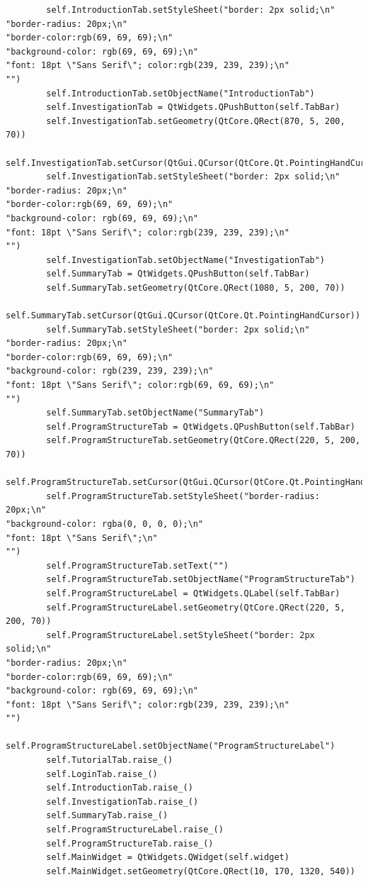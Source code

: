 \documentclass{article}
\begin{document}
\begin{lstlisting}
        self.IntroductionTab.setStyleSheet("border: 2px solid;\n"
"border-radius: 20px;\n"
"border-color:rgb(69, 69, 69);\n"
"background-color: rgb(69, 69, 69);\n"
"font: 18pt \"Sans Serif\"; color:rgb(239, 239, 239);\n"
"")
        self.IntroductionTab.setObjectName("IntroductionTab")
        self.InvestigationTab = QtWidgets.QPushButton(self.TabBar)
        self.InvestigationTab.setGeometry(QtCore.QRect(870, 5, 200, 70))
        self.InvestigationTab.setCursor(QtGui.QCursor(QtCore.Qt.PointingHandCursor))
        self.InvestigationTab.setStyleSheet("border: 2px solid;\n"
"border-radius: 20px;\n"
"border-color:rgb(69, 69, 69);\n"
"background-color: rgb(69, 69, 69);\n"
"font: 18pt \"Sans Serif\"; color:rgb(239, 239, 239);\n"
"")
        self.InvestigationTab.setObjectName("InvestigationTab")
        self.SummaryTab = QtWidgets.QPushButton(self.TabBar)
        self.SummaryTab.setGeometry(QtCore.QRect(1080, 5, 200, 70))
        self.SummaryTab.setCursor(QtGui.QCursor(QtCore.Qt.PointingHandCursor))
        self.SummaryTab.setStyleSheet("border: 2px solid;\n"
"border-radius: 20px;\n"
"border-color:rgb(69, 69, 69);\n"
"background-color: rgb(239, 239, 239);\n"
"font: 18pt \"Sans Serif\"; color:rgb(69, 69, 69);\n"
"")
        self.SummaryTab.setObjectName("SummaryTab")
        self.ProgramStructureTab = QtWidgets.QPushButton(self.TabBar)
        self.ProgramStructureTab.setGeometry(QtCore.QRect(220, 5, 200, 70))
        self.ProgramStructureTab.setCursor(QtGui.QCursor(QtCore.Qt.PointingHandCursor))
        self.ProgramStructureTab.setStyleSheet("border-radius: 20px;\n"
"background-color: rgba(0, 0, 0, 0);\n"
"font: 18pt \"Sans Serif\";\n"
"")
        self.ProgramStructureTab.setText("")
        self.ProgramStructureTab.setObjectName("ProgramStructureTab")
        self.ProgramStructureLabel = QtWidgets.QLabel(self.TabBar)
        self.ProgramStructureLabel.setGeometry(QtCore.QRect(220, 5, 200, 70))
        self.ProgramStructureLabel.setStyleSheet("border: 2px solid;\n"
"border-radius: 20px;\n"
"border-color:rgb(69, 69, 69);\n"
"background-color: rgb(69, 69, 69);\n"
"font: 18pt \"Sans Serif\"; color:rgb(239, 239, 239);\n"
"")
        self.ProgramStructureLabel.setObjectName("ProgramStructureLabel")
        self.TutorialTab.raise_()
        self.LoginTab.raise_()
        self.IntroductionTab.raise_()
        self.InvestigationTab.raise_()
        self.SummaryTab.raise_()
        self.ProgramStructureLabel.raise_()
        self.ProgramStructureTab.raise_()
        self.MainWidget = QtWidgets.QWidget(self.widget)
        self.MainWidget.setGeometry(QtCore.QRect(10, 170, 1320, 540))

\end{lstlisting}
\end{document}
